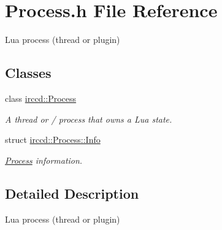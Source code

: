 \hypertarget{a00123}{\section{Process.\-h File Reference}
\label{a00123}
}


Lua process (thread or plugin)  


\subsection*{Classes}
\begin{DoxyCompactItemize}
\item 
class \hyperlink{a00052}{irccd\-::\-Process}
\begin{DoxyCompactList}\small\item\em A thread or / process that owns a Lua state. \end{DoxyCompactList}\item 
struct \hyperlink{a00030}{irccd\-::\-Process\-::\-Info}
\begin{DoxyCompactList}\small\item\em \hyperlink{a00052}{Process} information. \end{DoxyCompactList}\end{DoxyCompactItemize}


\subsection{Detailed Description}
Lua process (thread or plugin) 
